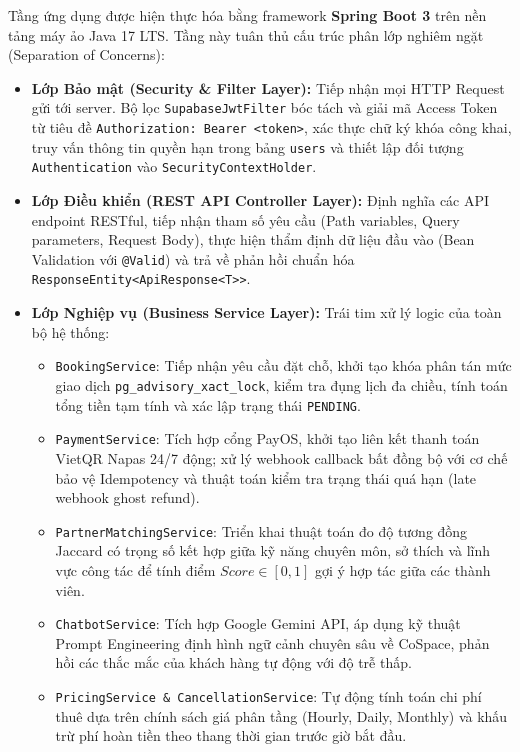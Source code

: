 
Tầng ứng dụng được hiện thực hóa bằng framework \textbf{Spring Boot 3} trên nền tảng máy ảo Java 17 LTS. Tầng này tuân thủ cấu trúc phân lớp nghiêm ngặt (Separation of Concerns):

\begin{itemize}
    \item \textbf{Lớp Bảo mật (Security \& Filter Layer):} Tiếp nhận mọi HTTP Request gửi tới server. Bộ lọc \texttt{SupabaseJwtFilter} bóc tách và giải mã Access Token từ tiêu đề \texttt{Authorization: Bearer <token>}, xác thực chữ ký khóa công khai, truy vấn thông tin quyền hạn trong bảng \texttt{users} và thiết lập đối tượng \texttt{Authentication} vào \texttt{SecurityContextHolder}.
    \item \textbf{Lớp Điều khiển (REST API Controller Layer):} Định nghĩa các API endpoint RESTful, tiếp nhận tham số yêu cầu (Path variables, Query parameters, Request Body), thực hiện thẩm định dữ liệu đầu vào (Bean Validation với \texttt{@Valid}) và trả về phản hồi chuẩn hóa \texttt{ResponseEntity<ApiResponse<T>>}.
    \item \textbf{Lớp Nghiệp vụ (Business Service Layer):} Trái tim xử lý logic của toàn bộ hệ thống:
    \begin{itemize}
        \item \texttt{BookingService}: Tiếp nhận yêu cầu đặt chỗ, khởi tạo khóa phân tán mức giao dịch \texttt{pg\_advisory\_xact\_lock}, kiểm tra đụng lịch đa chiều, tính toán tổng tiền tạm tính và xác lập trạng thái \texttt{PENDING}.
        \item \texttt{PaymentService}: Tích hợp cổng PayOS, khởi tạo liên kết thanh toán VietQR Napas 24/7 động; xử lý webhook callback bất đồng bộ với cơ chế bảo vệ Idempotency và thuật toán kiểm tra trạng thái quá hạn (late webhook ghost refund).
        \item \texttt{PartnerMatchingService}: Triển khai thuật toán đo độ tương đồng Jaccard có trọng số kết hợp giữa kỹ năng chuyên môn, sở thích và lĩnh vực công tác để tính điểm $Score \in [0, 1]$ gợi ý hợp tác giữa các thành viên.
        \item \texttt{ChatbotService}: Tích hợp Google Gemini API, áp dụng kỹ thuật Prompt Engineering định hình ngữ cảnh chuyên sâu về CoSpace, phản hồi các thắc mắc của khách hàng tự động với độ trễ thấp.
        \item \texttt{PricingService \& CancellationService}: Tự động tính toán chi phí thuê dựa trên chính sách giá phân tầng (Hourly, Daily, Monthly) và khấu trừ phí hoàn tiền theo thang thời gian trước giờ bắt đầu.

\end{itemize}
\end{itemize}
